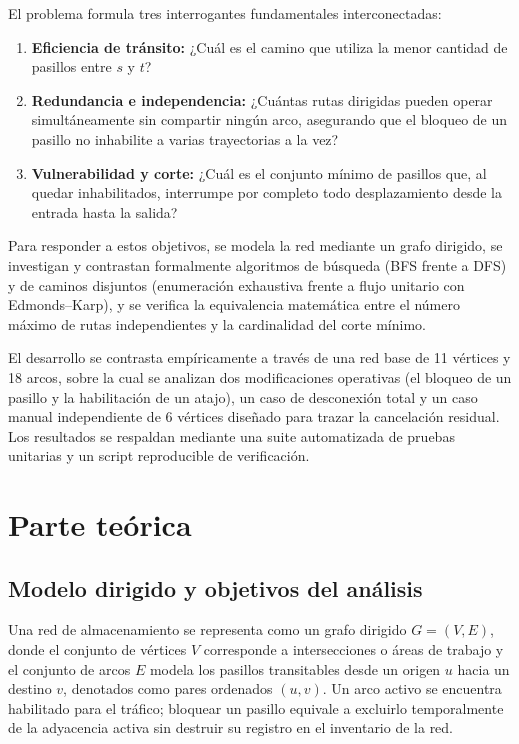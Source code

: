 \documentclass[11pt,a4paper]{article}
\begin{document}
El problema formula tres interrogantes fundamentales interconectadas:
\begin{enumerate}
  \item \textbf{Eficiencia de tránsito:} ¿Cuál es el camino que utiliza la menor cantidad de pasillos entre $s$ y $t$?
  \item \textbf{Redundancia e independencia:} ¿Cuántas rutas dirigidas pueden operar simultáneamente sin compartir ningún arco, asegurando que el bloqueo de un pasillo no inhabilite a varias trayectorias a la vez?
  \item \textbf{Vulnerabilidad y corte:} ¿Cuál es el conjunto mínimo de pasillos que, al quedar inhabilitados, interrumpe por completo todo desplazamiento desde la entrada hasta la salida?
\end{enumerate}

Para responder a estos objetivos, se modela la red mediante un grafo dirigido, se investigan y contrastan formalmente algoritmos de búsqueda (BFS frente a DFS) y de caminos disjuntos (enumeración exhaustiva frente a flujo unitario con Edmonds--Karp), y se verifica la equivalencia matemática entre el número máximo de rutas independientes y la cardinalidad del corte mínimo.

El desarrollo se contrasta empíricamente a través de una red base de 11 vértices y 18 arcos, sobre la cual se analizan dos modificaciones operativas (el bloqueo de un pasillo y la habilitación de un atajo), un caso de desconexión total y un caso manual independiente de 6 vértices diseñado para trazar la cancelación residual. Los resultados se respaldan mediante una suite automatizada de pruebas unitarias y un script reproducible de verificación.

\newpage
\section{Parte teórica}

\subsection{Modelo dirigido y objetivos del análisis}
Una red de almacenamiento se representa como un grafo dirigido $G = (V, E)$, donde el conjunto de vértices $V$ corresponde a intersecciones o áreas de trabajo y el conjunto de arcos $E$ modela los pasillos transitables desde un origen $u$ hacia un destino $v$, denotados como pares ordenados $(u, v)$. Un arco activo se encuentra habilitado para el tráfico; bloquear un pasillo equivale a excluirlo temporalmente de la adyacencia activa sin destruir su registro en el inventario de la red.
\end{document}
